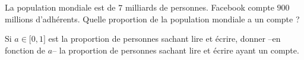 
\begin{exercice}\label{exoPremiere-0001}

    La population mondiale est de \( 7\) milliards de personnes. Facebook compte \( 900\) millions d'adhérents. Quelle proportion de la population mondiale a un compte ?

    Si \( a\in \mathopen[ 0 , 1 \mathclose]\) est la proportion de personnes sachant lire et écrire, donner --en fonction de \( a\)-- la proportion de personnes sachant lire et écrire ayant un compte.

\end{exercice}
